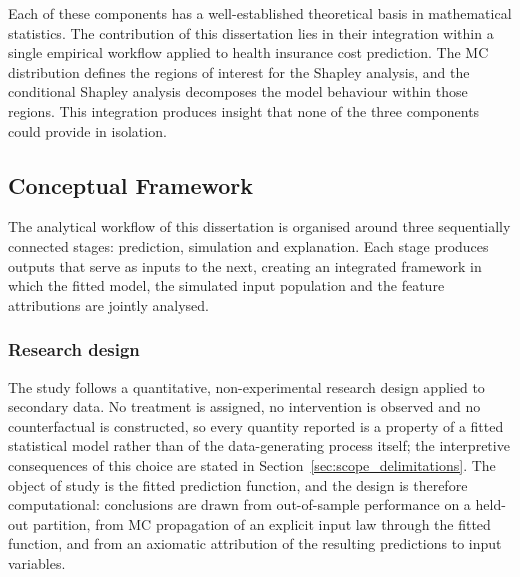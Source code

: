 Each of these components has a well-established theoretical basis in
mathematical statistics.  The contribution of this dissertation lies in
their integration within a single empirical workflow applied to health
insurance cost prediction.  The MC distribution defines the
regions of interest for the Shapley analysis, and the conditional
Shapley analysis decomposes the model behaviour within those regions.
This integration produces insight that none of the three components
could provide in isolation.


\subsection{Conceptual Framework}
\label{sec:conceptual_framework}

The analytical workflow of this dissertation is organised around three
sequentially connected stages: prediction, simulation and explanation.
Each stage produces outputs that serve as inputs to the next, creating an
integrated framework in which the fitted model, the simulated input
population and the feature attributions are jointly analysed.

\subsubsection{Research design}
\label{sec:research_design}

The study follows a quantitative, non-experimental research design
applied to secondary data.  No treatment is assigned, no intervention is
observed and no counterfactual is constructed, so every quantity reported
is a property of a fitted statistical model rather than of the
data-generating process itself; the interpretive consequences of this
choice are stated in Section~\ref{sec:scope_delimitations}.  The object
of study is the fitted prediction function, and the design is therefore
computational: conclusions are drawn from out-of-sample performance on a
held-out partition, from MC propagation of an explicit input law
through the fitted function, and from an axiomatic attribution of the
resulting predictions to input variables.

